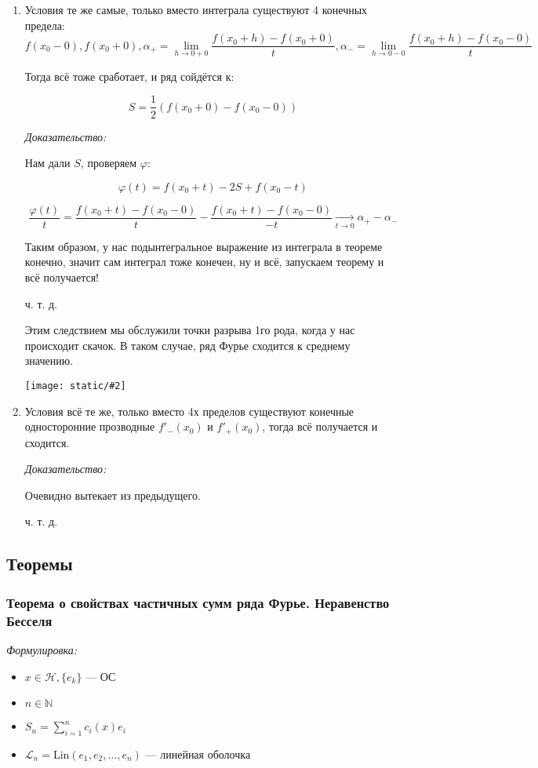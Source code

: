 \documentclass{article}
\def\images#1#2{\begin{center}\texttt{[image: static/\#2]}\end{center}}
\def\goesto#1{\underset{#1}{\longrightarrow}}
\begin{document}
\begin{enumerate}
    \item Условия те же самые, только вместо интеграла существуют 4 конечных предела:
    \[f(x_0 - 0), f(x_0 + 0), \alpha_+ = \lim_{h \rightarrow 0 + 0} \frac{f(x_0 + h) - f(x_0 + 0)}{t}, \alpha_- = \lim_{h \rightarrow 0 - 0} \frac{f(x_0 + h) - f(x_0 - 0)}{t}\]

    Тогда всё тоже сработает, и ряд сойдётся к:

    \[S = \frac{1}{2}(f(x_0 + 0) - f(x_0 - 0))\]

    \textit{Доказательство: }


    Нам дали $S$, проверяем $\varphi$:

    \[\varphi(t) = f(x_0 + t) - 2S + f(x_0 - t)\]

    \[\frac{\varphi(t)}{t} = \frac{f(x_0 + t) - f(x_0 - 0)}{t} - \frac{f(x_0 + t) - f(x_0 - 0)}{-t} \goesto{t \rightarrow 0} \alpha_+ - \alpha_-\]

    Таким образом, у нас подынтегральное выражение из интеграла в теореме конечно, значит сам интеграл тоже конечен, ну и всё, запускаем теорему и всё получается!

    ч. т. д.

    Этим следствием мы обслужили точки разрыва 1го рода, когда у нас происходит скачок. В таком случае, ряд Фурье сходится к среднему значению.

    \images{0.3}{priznak_dini.jpg}

    \item Условия всё те же, только вместо 4х пределов существуют конечные односторонние прозводные $f'_-(x_0)$ и $f'_+(x_0)$, тогда всё получается и сходится.
    
    \textit{Доказательство:}

    Очевидно вытекает из предыдущего.

    ч. т. д.
\end{enumerate}

\newpage
\subsection{Теоремы}

\subsubsection{Теорема о свойствах частичных сумм ряда Фурье. Неравенство Бесселя}
\textit{Формулировка:}

\begin{itemize}
    \item $x \in \mathcal{H}, \{e_k\}$ --- ОС
    \item $n \in \mathbb{N}$
    \item $S_n = \sum_{i = 1}^{n} c_i(x)e_i$
    \item $\mathcal{L}_n = \text{Lin}(e_1, e_2, \ldots, e_n)$ --- линейная оболочка
\end{itemize}
\end{document}
